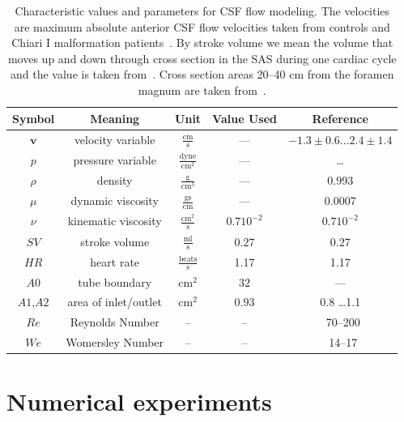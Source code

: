 \begin{table}
\begin{center}
    \begin{tabular}{ | c | c | c | c | c | }
    \hline
    Symbol & Meaning & Unit & Value Used & Reference \\ \hline\hline
	$\mathbf{v}$	& velocity variable & $\mathrm{ \frac{cm}{s}}$ & --- & $-1.3\pm 0.6 \ldots 2.4 \pm 1.4$  \\
	$p$		& pressure	variable & $\mathrm{\frac{dyne}{cm^2}}$ & --- & \ldots\\
	$\rho$	& density & $\mathrm{\frac{g}{cm^3}}$ & --- &0.993 \\ %
	$\mu$	& dynamic viscosity	&  $\mathrm{\frac{g s}{cm}}$ & --- & 0.0007\\
	$\nu$	& kinematic viscosity & $\mathrm{ \frac{cm^2}{s}}$ & $0.7 10^{-2}$ & $0.7 10^{-2}$ \\ 	\hline %
	$SV$	& stroke volume 	& $\mathrm{ \frac{ml}{s}}$& $0.27$  & $0.27$ \\
	$HR$	& heart rate & $\mathrm{\frac{beats}{s}}$	& 1.17 & 1.17\\
	$A0$	& tube boundary	& $\mathrm{ cm^2}$ & $32$  & ---\\
	$A1$,$A2$	& area of inlet/outlet & $\mathrm{ cm^2}$ &$0.93$ & 0.8 \ldots 1.1   \\
    \hline
    $Re$    & Reynolds Number & -- & -- & ~70--200 \\
    $We$    & Womersley Number & -- & -- & ~14--17 \\
    \hline
    \end{tabular}
	\label{tab:entities}
\vspace{1cm}
\caption{
Characteristic values and parameters for CSF flow modeling.  The
velocities are maximum absolute anterior CSF flow velocities taken
from controls and Chiari I malformation
patients~\citep{HofmannWarmuth-MetzBendszusEtAl2000}.  By stroke
volume we mean the volume that moves up and down through cross section
in the SAS during one cardiac cycle and the value is taken
from~\citep{GuptaSoellingerBoesigerEtAl2009}.  Cross section areas
20--40 cm from the foramen magnum are taken
from~\citep{LothYardimciAlperin2001}.  }
\end{center}
\end{table}

\vspace{6cm}

\section{Numerical experiments}

